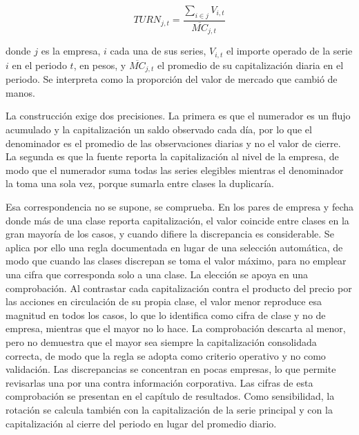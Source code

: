 \begin{equation}TURN_{j,t} = \frac{\sum_{i \in j}^{}V_{i,t}}{{\overline{MC}}_{j,t}}\tag{7}\end{equation}


donde $j$ es la empresa, $i$ cada una de sus series, $V_{i,t}$ el importe operado de la serie $i$ en el periodo $t$, en pesos, y ${\overline{MC}}_{j,t}$ el promedio de su capitalización diaria en el periodo. Se interpreta como la proporción del valor de mercado que cambió de manos.

La construcción exige dos precisiones. La primera es que el numerador es un flujo acumulado y la capitalización un saldo observado cada día, por lo que el denominador es el promedio de las observaciones diarias y no el valor de cierre. La segunda es que la fuente reporta la capitalización al nivel de la empresa, de modo que el numerador suma todas las series elegibles mientras el denominador la toma una sola vez, porque sumarla entre clases la duplicaría.

Esa correspondencia no se supone, se comprueba. En los pares de empresa y fecha donde más de una clase reporta capitalización, el valor coincide entre clases en la gran mayoría de los casos, y cuando difiere la discrepancia es considerable. Se aplica por ello una regla documentada en lugar de una selección automática, de modo que cuando las clases discrepan se toma el valor máximo, para no emplear una cifra que corresponda solo a una clase. La elección se apoya en una comprobación. Al contrastar cada capitalización contra el producto del precio por las acciones en circulación de su propia clase, el valor menor reproduce esa magnitud en todos los casos, lo que lo identifica como cifra de clase y no de empresa, mientras que el mayor no lo hace. La comprobación descarta al menor, pero no demuestra que el mayor sea siempre la capitalización consolidada correcta, de modo que la regla se adopta como criterio operativo y no como validación. Las discrepancias se concentran en pocas empresas, lo que permite revisarlas una por una contra información corporativa. Las cifras de esta comprobación se presentan en el capítulo de resultados. Como sensibilidad, la rotación se calcula también con la capitalización de la serie principal y con la capitalización al cierre del periodo en lugar del promedio diario.

